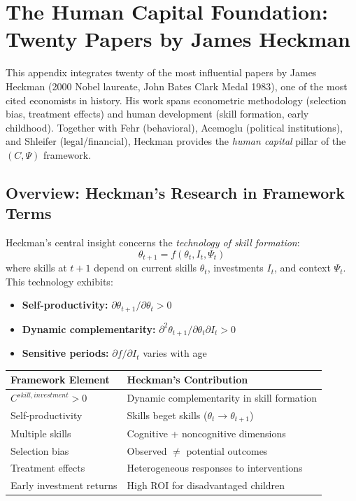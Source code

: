 \documentclass[12pt,a4paper]{article}
\begin{document}
\section{The Human Capital Foundation: Twenty Papers by James Heckman}
\label{app:heckman}

This appendix integrates twenty of the most influential papers by James Heckman
(2000 Nobel laureate, John Bates Clark Medal 1983), one of the most cited
economists in history. His work spans econometric methodology (selection bias,
treatment effects) and human development (skill formation, early childhood).
Together with Fehr (behavioral), Acemoglu (political institutions), and
Shleifer (legal/financial), Heckman provides the \emph{human capital} pillar
of the $(C, \Psi)$ framework.

\subsection{Overview: Heckman's Research in Framework Terms}

Heckman's central insight concerns the \emph{technology of skill formation}:
\begin{equation}
  \theta_{t+1} = f(\theta_t, I_t, \Psi_t)
\end{equation}
where skills at $t+1$ depend on current skills $\theta_t$, investments $I_t$,
and context $\Psi_t$. This technology exhibits:
\begin{itemize}
  \item \textbf{Self-productivity:} $\partial\theta_{t+1}/\partial\theta_t > 0$
  \item \textbf{Dynamic complementarity:} $\partial^2\theta_{t+1}/\partial\theta_t\partial I_t > 0$
  \item \textbf{Sensitive periods:} $\partial f/\partial I_t$ varies with age
\end{itemize}

\begin{center}
\renewcommand{\arraystretch}{1.2}
\small
\begin{tabular}{ll}
\hline
\textbf{Framework Element} & \textbf{Heckman's Contribution} \\
\hline
$C^{skill,investment} > 0$ & Dynamic complementarity in skill formation \\
Self-productivity & Skills beget skills ($\theta_t \to \theta_{t+1}$) \\
Multiple skills & Cognitive + noncognitive dimensions \\
Selection bias & Observed $\neq$ potential outcomes \\
Treatment effects & Heterogeneous responses to interventions \\
Early investment returns & High ROI for disadvantaged children \\
\hline
\end{tabular}
\end{center}
\end{document}
